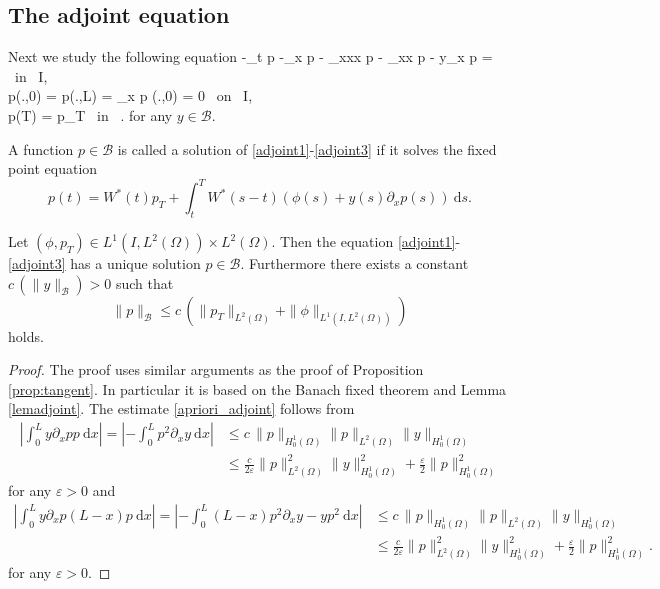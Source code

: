 \subsection{The adjoint equation}
\label{appendixadjoint}
Next we study the following equation
\besn
-\partial_t p -\partial_x p - \partial_{xxx} p - \gamma \partial_{xx} p  - y\partial_x p =  \phi \mbox{ in } I\times\Omega,\label{adjoint1}\\
p(.,0) = p(.,L) = \partial_x p (.,0) = 0 \mbox{ on } I,\label{adjoint2}\\
p(T) = p_{T} \mbox{ in } \Omega.\label{adjoint3}
\eesn
for any $y\in \mathcal B$.
\begin{Def}
A function $p\in \mathcal B$ is called a solution of \eqref{adjoint1}-\eqref{adjoint3} if it solves the fixed point equation
\[
p(t)=W^*(t)p_T+\int_t^TW^*(s-t)(\phi(s)+y(s)\partial_x p(s))~\mathrm ds.
\]
\end{Def}
\begin{prop}
Let $(\phi,p_T)\in L^1(I,L^2(\Omega))\times L^2(\Omega)$. Then the equation \eqref{adjoint1}-\eqref{adjoint3} has a unique solution $p\in \mathcal B$. Furthermore there exists a constant $c\,(\|y\|_{\mathcal B})>0$ such that
\begin{equation}\label{apriori_adjoint}
\|p\|_{\mathcal B}\leq c\,(\|p_T\|_{L^2(\Omega)}+\|\phi\|_{L^1(I,L^2(\Omega))})
\end{equation}
holds.
\end{prop}
\begin{proof}
The proof uses similar arguments as the proof of Proposition \ref{prop:tangent}. In particular it is based on the Banach fixed theorem and Lemma \eqref{lemadjoint}. The estimate \eqref{apriori_adjoint} follows from
\begin{align*}
\left|\int_0^Ly\partial_xpp~\mathrm dx\right|=\left|-\int_0^Lp^2\partial_xy~\mathrm dx\right|&\leq c\,\|p\|_{H^1_0(\Omega)}\|p\|_{L^2(\Omega)}\|y\|_{H^1_0(\Omega)}\\
&\leq \frac{c}{2\varepsilon}\|p\|_{L^2(\Omega)}^2\|y\|_{H^1_0(\Omega)}^2+\frac{\varepsilon}{2}\|p\|_{H^1_0(\Omega)}^2
\end{align*}
for any $\varepsilon>0$ and 
\begin{align*}
\left|\int_0^Ly\partial_xp(L-x)p~\mathrm dx\right|=\left|-\int_0^L(L-x)p^2\partial_xy-yp^2~\mathrm dx\right|&\leq c\,\|p\|_{H^1_0(\Omega)}\|p\|_{L^2(\Omega)}\|y\|_{H^1_0(\Omega)}\\
&\leq \frac{c}{2\varepsilon}\|p\|_{L^2(\Omega)}^2\|y\|_{H^1_0(\Omega)}^2+\frac{\varepsilon}{2}\|p\|_{H^1_0(\Omega)}^2.
\end{align*}
for any $\varepsilon>0$.
\end{proof}

